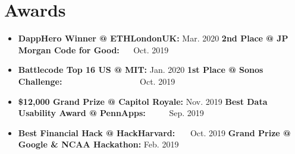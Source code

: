 \documentclass[letterpaper,11pt]{article}
\newcommand{\resumeItem}[2]{
  \item[]\small{
    \textbf{#1}{#2\vspace{-2pt}}
  }
}
\newcommand{\resumeItemListStart}{\begin{itemize}[leftmargin=*]}
\newcommand{\resumeItemListEnd}{\end{itemize}\vspace{-5pt}}
\begin{document}
      
     \vspace{-3mm}
\section{Awards}
   \resumeItemListStart
        \resumeItem{\small DappHero Winner @ ETHLondonUK: }{\hspace{0.9mm} Mar. \hspace{-0.3mm}2020 \hfill \textbf{2nd Place @ JP Morgan Code for Good: }\ \ \hspace{3mm} Oct. 2019}
        \resumeItem{\small Battlecode Top 16 US @ MIT: }{\hspace{15.9mm}Jan. \hspace{0.4mm}2020 \hfill \textbf{1st Place @ Sonos Challenge: }\hspace{6mm}\ \ \ \ \ \ \ \ \ \ \ \ \ \ \ \ \ \ Oct. 2019}
        \resumeItem{\small \$12,000 Grand Prize @ Capitol Royale: }{Nov. 2019 \hfill \textbf{Best Data Usability Award @ PennApps: }\ \ \ \ \ Sep. 2019}
        \resumeItem{\small Best Financial Hack @ HackHarvard: }{\ \ \ Oct. \hspace{0.4mm}2019 \hfill \textbf{Grand Prize @ Google \& NCAA Hackathon: }Feb. 2019}
      \resumeItemListEnd
\end{document}
